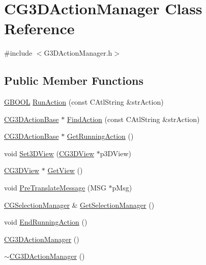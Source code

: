 \hypertarget{class_c_g3_d_action_manager}{}\section{C\+G3\+D\+Action\+Manager Class Reference}
\label{class_c_g3_d_action_manager}


{\ttfamily \#include $<$G3\+D\+Action\+Manager.\+h$>$}

\subsection*{Public Member Functions}
\begin{DoxyCompactItemize}
\item 
\hyperlink{_g_types_8h_a2901915743626352a6820c5405f556dc}{G\+B\+O\+O\+L} \hyperlink{class_c_g3_d_action_manager_a5d9e0078b2bc2dde9ee2116572cf7c9c}{Run\+Action} (const C\+Atl\+String \&str\+Action)
\item 
\hyperlink{class_c_g3_d_action_base}{C\+G3\+D\+Action\+Base} $\ast$ \hyperlink{class_c_g3_d_action_manager_a121c2d5c207596349fdb4a96a441b3b5}{Find\+Action} (const C\+Atl\+String \&str\+Action)
\item 
\hyperlink{class_c_g3_d_action_base}{C\+G3\+D\+Action\+Base} $\ast$ \hyperlink{class_c_g3_d_action_manager_a873c6e75c7bb78c71a8d7b9f3c0de0d3}{Get\+Running\+Action} ()
\item 
void \hyperlink{class_c_g3_d_action_manager_ae353bb909ba1a439e07089f27acc8a89}{Set3\+D\+View} (\hyperlink{class_c_g3_d_view}{C\+G3\+D\+View} $\ast$p3\+D\+View)
\item 
\hyperlink{class_c_g3_d_view}{C\+G3\+D\+View} $\ast$ \hyperlink{class_c_g3_d_action_manager_ad7871f81f7e9b7a66a3e396526795079}{Get\+View} ()
\item 
void \hyperlink{class_c_g3_d_action_manager_a00c9ecbb2c9b8d371ed4d9057e9e43f6}{Pre\+Translate\+Message} (M\+S\+G $\ast$p\+Msg)
\item 
\hyperlink{class_c_g_selection_manager}{C\+G\+Selection\+Manager} \& \hyperlink{class_c_g3_d_action_manager_a1086e5a10a607f2cf2f921a360529922}{Get\+Selection\+Manager} ()
\item 
void \hyperlink{class_c_g3_d_action_manager_aaa96d6562621542b8547a05c93f958d6}{End\+Running\+Action} ()
\item 
\hyperlink{class_c_g3_d_action_manager_a1c39a03fef013cc8b17cc92043d06726}{C\+G3\+D\+Action\+Manager} ()
\item 
\hyperlink{class_c_g3_d_action_manager_a3ccbbb2d12428530f550cba714223532}{$\sim$\+C\+G3\+D\+Action\+Manager} ()
\end{DoxyCompactItemize}


